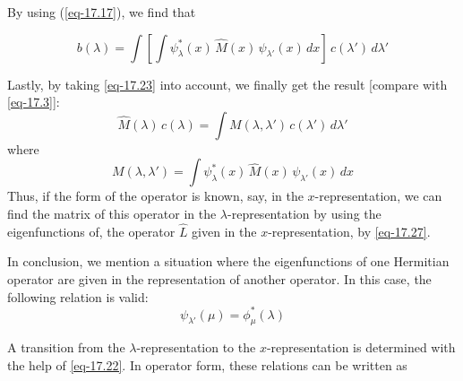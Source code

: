 \documentclass[a4paper,sfsidenotes,colorlinks=true]{tufte-book}
\numberwithin{equation}{section}
\numberwithin{figure}{section}
\begin{document}
By using (\ref{eq-17.17}), we find that

\begin{equation*}%
b(\lambda) = \int \left[ \int \psi^{*}_{\lambda} (x) \, \hat{M}(x) \,
  \psi_{\lambda'} (x) \, dx \right] \, c (\lambda') \, d \lambda'
\end{equation*}

Lastly, by taking \ref{eq-17.23} into account, we finally get the result
[compare with \ref{eq-17.3}]:
\begin{equation*}%
\hat{M} (\lambda) \, c (\lambda) = \int M(\lambda, \lambda') \,
c(\lambda') \, d \lambda'
\end{equation*}
where 
\begin{equation}%
M(\lambda, \lambda') = \int  \psi^{*}_{\lambda} (x) \, \hat{M}(x) \,
  \psi_{\lambda'} (x) \, dx
\label{eq-17.27}
\end{equation}
Thus, if the form of the operator is known, say, in the
$x$-representation, we can find the matrix of this operator in the
$\lambda$-representation by using the eigenfunctions of, the operator
$\hat{L}$ given in the $x$-representation, by \ref{eq-17.27}.

In conclusion, we mention a situation where the eigenfunctions of
one Hermitian operator are given in the representation of another
operator. In this case, the following relation is valid: 
\begin{equation}%
  \psi_{\lambda'} (\mu) =  \phi^{*}_{\mu} (\lambda)
\label{eq-17.28}
\end{equation}

A transition from the
$\lambda$-representation to the $x$-representation is determined with the help
of \ref{eq-17.22}. In operator form, these relations can be written as
\end{document}
